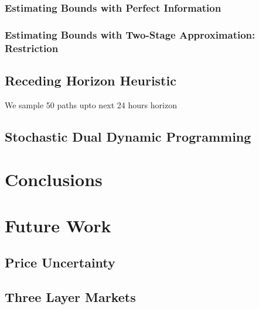 \documentclass[11pt,twoside]{article}
\begin{document}
\subsubsection{Estimating Bounds with Perfect Information}
\subsubsection{Estimating Bounds with Two-Stage 	Approximation: Restriction}
\subsection{Receding Horizon Heuristic}
We sample 50 paths upto next 24 hours horizon 
\subsection{Stochastic Dual Dynamic Programming}
\section{Conclusions}
\section{Future Work}
\subsection{Price Uncertainty}
\subsection{Three Layer Markets}




\end{document}
